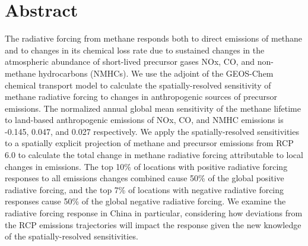 \section*{Abstract}

The radiative forcing from methane responds both to direct emissions of methane and to changes in its chemical loss rate due to sustained changes in the atmospheric abundance of short-lived precursor gases NOx, CO, and non-methane hydrocarbons (NMHCs). We use the adjoint of the GEOS-Chem chemical transport model to calculate the spatially-resolved sensitivity of methane radiative forcing to changes in anthropogenic sources of precursor emissions. The normalized annual global mean sensitivity of the methane lifetime to land-based anthropogenic emissions of NOx, CO, and NMHC emissions is -0.145, 0.047, and 0.027 respectively. We apply the spatially-resolved sensitivities to a spatially explicit projection of methane and precursor emissions from RCP 6.0 to calculate the total change in methane radiative forcing attributable to local changes in emissions. The top 10\% of locations with positive radiative forcing responses to all emissions changes combined cause 50\% of the global positive radiative forcing, and the top 7\% of locations with negative radiative forcing responses cause 50\% of the global negative radiative forcing. We examine the radiative forcing response in China in particular, considering how deviations from the RCP emissions trajectories will impact the response given the new knowledge of the spatially-resolved sensitivities.